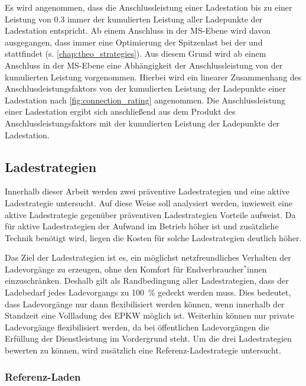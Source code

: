 Es wird angenommen, dass die Anschlussleistung einer Ladestation bis zu einer Leistung von \SI{0.3}{\mva} immer der kumulierten Leistung aller Ladepunkte der Ladestation entspricht.
Ab einem Anschluss in der \gls{MS}-Ebene wird davon ausgegangen, dass immer eine Optimierung der Spitzenlast bei der \UCs \zH und \Firmeparkplatz stattfindet (s. \autoref{chap:theo_strategies}).
Aus diesem Grund wird ab einem Anschluss in der \gls{MS}-Ebene eine Abhängigkeit der Anschlussleistung von der kumulierten Leistung vorgenommen.
Hierbei wird ein linearer Zusammenhang des Anschlussleistungsfaktors von der kumulierten Leistung der Ladepunkte einer Ladestation nach \autoref{fig:connection_rating} angenommen.
Die Anschlussleistung einer Ladestation ergibt sich anschließend aus dem Produkt des Anschlussleistungsfaktors mit der kumulierten Leistung der Ladepunkte der Ladestation.




\subsection{Ladestrategien}\label{chap:theo_strategies}

Innerhalb dieser Arbeit werden zwei präventive Ladestrategien und eine aktive Ladestrategie untersucht.
Auf diese Weise soll analysiert werden, inwieweit eine aktive Ladestrategie gegenüber präventiven Ladestrategien Vorteile aufweist.
Da für aktive Ladestrategien der Aufwand im Betrieb höher ist und zusätzliche Technik benötigt wird, liegen die Kosten für solche Ladestrategien deutlich höher.\medskip

Das Ziel der Ladestrategien ist es, ein möglichst netzfreundliches Verhalten der Ladevorgänge zu erzeugen, ohne den Komfort für Endverbraucher$^*$innen einzuschränken.
Deshalb gilt als Randbedingung aller Ladestrategien, dass der Ladebedarf jedes Ladevorgangs zu \SI{100}{\percent} gedeckt werden muss.
Dies bedeutet, dass Ladevorgänge nur dann flexibilisiert werden können, wenn innerhalb der Standzeit eine Vollladung des \gls{EPKW} möglich ist.
Weiterhin können nur private Ladevorgänge flexibilisiert werden, da bei öffentlichen Ladevorgängen die Erfüllung der Dienstleistung im Vordergrund steht.
Um die drei Ladestrategien bewerten zu können, wird zusätzlich eine Referenz-Ladestrategie untersucht.


\subsubsection{Referenz-Laden}

